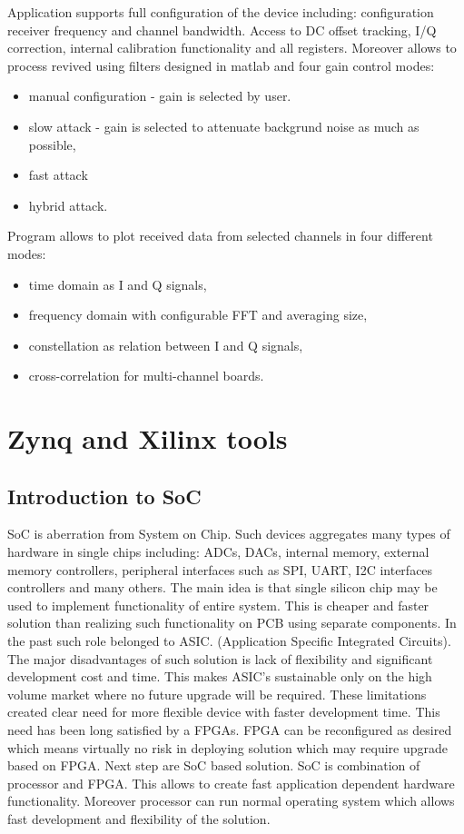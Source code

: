 \documentclass[en,printmode]{mgr}
\begin{document}
			Application supports full configuration of the device including: configuration receiver
			frequency and channel bandwidth. Access to DC offset tracking, I/Q correction,
			internal calibration functionality and all registers. Moreover allows to process revived
			using filters designed in matlab and four gain control modes:
			\begin{itemize}
				\item manual configuration - gain is selected by user.
				\item slow attack - gain is selected to attenuate  backgrund noise as much as
				possible,
				\item fast attack
				\item hybrid attack.
				
			\end{itemize}
			\vspace{5mm}
							
			\noindent
			Program allows to plot received data from selected channels in four different modes:
			\begin{itemize}
				\item time domain as I and Q signals,
				\item frequency domain with configurable FFT and averaging size,
				\item constellation as relation between I and Q signals,
				\item cross-correlation for multi-channel boards.
			\end{itemize}

	\section{Zynq and Xilinx tools}
		\subsection*{Introduction to SoC}
		SoC is aberration from System on Chip. Such devices aggregates
		many types of hardware in single chips including: ADCs, DACs, internal memory, external 
		memory controllers, peripheral interfaces such as SPI, UART, I2C
		interfaces controllers and many others. The main idea is that single silicon chip may be
		used to implement functionality of entire system. This is cheaper and faster solution than
		realizing such functionality on PCB using separate components. In the past such role
		belonged to ASIC.
		(Application Specific Integrated Circuits). The major disadvantages of such solution is lack
		of flexibility and significant development cost and time. This makes ASIC's sustainable only
		on the high volume market where no future upgrade will be required. These limitations created
		clear need for more flexible device with faster development time. This need has been long
		satisfied by a FPGAs. FPGA can be reconfigured as desired which means virtually no risk in
		deploying solution which may require upgrade based on FPGA. Next step are SoC based solution.
		SoC is combination of processor and FPGA. This allows to create fast application dependent
		hardware functionality. Moreover processor can run normal operating system which allows fast
		development and flexibility of the solution.
		
\end{document}
